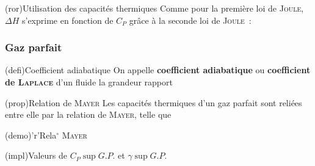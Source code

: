 \documentclass[../../main/main.tex]{subfiles}
\begin{document}
\begin{tcb*}(ror){Utilisation des capacités thermiques}
	Comme pour la première loi de \textsc{Joule}, $\Delta{H}$ s'exprime en
	fonction de $C_P$ grâce à la seconde loi de \textsc{Joule}~:
	\vspace{-15pt}
	\vspace{-15pt}
\end{tcb*}

\subsubsection{Gaz parfait}
\begin{tcb*}(defi){Coefficient adiabatique}
	On appelle \textbf{coefficient adiabatique} ou \textbf{coefficient de
		\textsc{Laplace}} d'un fluide la grandeur
	rapport
	\psw{%
		\[
			\boxed{\gamma = \frac{C_P}{C_V}}
		\]
	}%
\end{tcb*}

\begin{tcbraster}[raster equal height=rows, raster columns=2]
	\begin{tcb*}(prop){Relation de \textsc{Mayer}}
		Les capacités thermiques d'un gaz parfait sont reliées entre elle par la
		relation de \textsc{Mayer}, telle que
		\psw{%
			\[
				\boxed{C_P = C_V + nR}
			\]
		}%
		\vspace{-15pt}
	\end{tcb*}
	\begin{tcb*}[%
			list entry={\hspace*{-20pt}\protect\rcheck~~Relation de \textsc{Mayer}}%
		](demo)'r'{Rela$^\circ$ \textsc{Mayer}}
		\psw{%
			\[
				H = U + nRT
				\Ra
				\dv{H}{T} = \dv{U}{T} + nR
				\qed
			\]
		}%
		\vspace{-15pt}
	\end{tcb*}
\end{tcbraster}

\begin{tcb*}[sidebyside,
		sidebyside align=top](impl){Valeurs de $C_P\sup{G.P.}$ et $\gamma\sup{G.P.}$}
	\tcblower
\end{tcb*}
\end{document}
